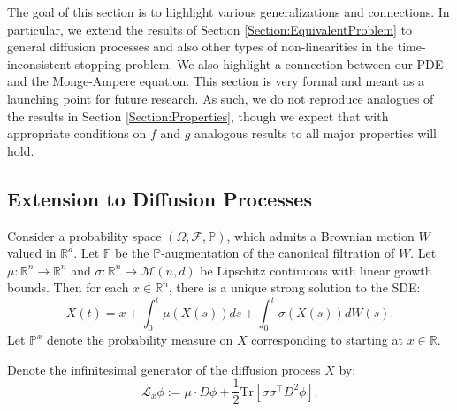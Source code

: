 \documentclass[11pt]{article}
\begin{document}
The goal of this section is to highlight various generalizations and connections. In particular, we extend the results of Section \ref{Section:EquivalentProblem} to general diffusion processes and also other types of non-linearities in the time-inconsistent stopping problem. We also highlight a connection between our PDE and the Monge-Ampere equation. This section is very formal and meant as a launching point for future research. As such, we do not reproduce analogues of the results in Section \ref{Section:Properties}, though we expect that with appropriate conditions on $f$ and $g$ analogous results to all major properties will hold.

\subsection{Extension to Diffusion Processes}\label{Subsection:Extension}

Consider a probability space $(\Omega,\mathcal{F},\mathbb{P})$, which admits a Brownian motion $W$ valued in $\mathbb{R}^d$. Let $\mathbb{F}$ be the $\mathbb{P}$-augmentation of the canonical filtration of $W$. Let $\mu:\mathbb{R}^n\to\mathbb{R}^n$ and $\sigma:\mathbb{R}^n\to\mathcal{M}(n,d)$ be Lipschitz continuous with linear growth bounds. Then for each $x\in\mathbb{R}^n$, there is a unique strong solution to the SDE:
\begin{equation}
X(t) = x + \int_0^t \mu(X(s))ds + \int_0^t \sigma(X(s))dW(s).
\end{equation}
Let $\mathbb{P}^x$ denote the probability measure on $X$ corresponding to starting at $x\in\mathbb{R}$.

Denote the infinitesimal generator of the diffusion process $X$ by:
\begin{equation}
\mathcal{L}_x\phi := \mu\cdot D\phi + \frac{1}{2}\text{Tr}\left[\sigma\sigma^\top D^2\phi\right].
\end{equation}
\end{document}
